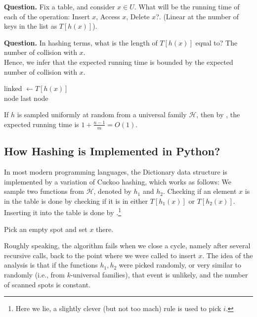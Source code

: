 \textbf{Question.} Fix a table, and consider $x \in U$. What will be the running time of each of the operation: Insert $x$, Access $x$, Delete $x$?. (Linear at the number of keys in the list as $T[h(x)]$).  

\textbf{Question.} In hashing terms, what is the length of $T[h(x)]$ equal to? The number of collision with $x$.  
\\

Hence, we infer that the expected running time is bounded by the expected number of collision with $x$. 
  \begin{algorithm}
    \label{alg:openhash}
  \caption{Universal Hashing Table - access}
  linked $\leftarrow  T[h(x)] $  \\
   {
     {
      \Return node
    }
  }
  \Return last node
  \end{algorithm}
If $h$ is sampled uniformly at random from a universal family $\mathcal{H}$, then by , the expected running time is $1 + \frac{n-1}{m} = O(1)$.


\subsection{How Hashing is Implemented in Python?} 
In most modern programming languages, the Dictionary data structure is implemented by a variation of Cuckoo hashing, which works as follows: We sample two functions from $\mathcal{H}$, denoted by $h_{1}$ and $h_{2}$. Checking if an element $x$ is in the table is done by checking if it is in either $T[h_{1}(x)]$ or $T[h_{2}(x)]$. Inserting it into the table is done by .\footnote{Here we lie, a slightly clever (but not too mach) rule is used to pick $i$. }

\begin{algorithm}
     {
      Pick an empty spot and set $x$ there. \\
      \Return
    }
  \caption{Cuckoo - Insert}
    \label{alg:cucko}
  \end{algorithm}
Roughly speaking, the algorithm fails when we close a cycle, namely after several recursive calls, back to the point where we were called to insert $x$. The idea of the analysis is that if the functions $h_{1}, h_{2}$ were picked randomly, or very similar to randomly (i.e., from $k$-universal families), that event is unlikely, and the number of scanned spots is constant.


